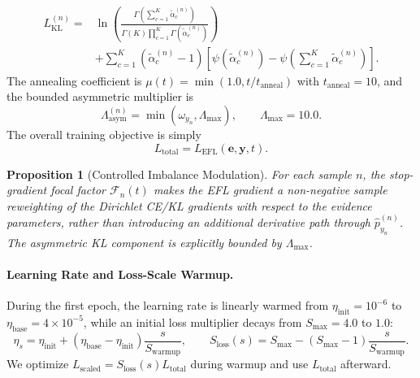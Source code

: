 \documentclass[letterpaper]{article} %
\newtheorem{proposition}{Proposition}
\begin{document}
\begin{equation}\label{eq:kl_loss_main}
\begin{aligned}
    L_{\text{KL}}^{(n)}
    ={}& \ln \left(
    \frac{\Gamma\left(\sum_{c=1}^K\tilde{\alpha}_c^{(n)}\right)}
    {\Gamma(K)\prod_{c=1}^K\Gamma(\tilde{\alpha}_c^{(n)})}
    \right)\\
    &+\sum_{c=1}^K(\tilde{\alpha}_c^{(n)}-1)
    \left[
    \psi(\tilde{\alpha}_c^{(n)})
    -\psi\!\left(\sum_{c=1}^K\tilde{\alpha}_c^{(n)}\right)
    \right].
\end{aligned}
\end{equation}
The annealing coefficient is $\mu(t)=\min(1.0,t/t_{\text{anneal}})$ with $t_{\text{anneal}}=10$, and the bounded asymmetric multiplier is
\begin{equation}\label{eq:asym_multiplier}
    \Lambda_{\text{asym}}^{(n)}
    = \min(\omega_{y_n},\Lambda_{\max}),
    \qquad \Lambda_{\max}=10.0 .
\end{equation}
The overall training objective is simply
\begin{equation}\label{eq:total_loss}
    L_{\text{total}}=L_{\text{EFL}}(\bm{e},\bm{y},t).
\end{equation}

\begin{proposition}[Controlled Imbalance Modulation]
\label{prop:controlled_modulation}
For each sample $n$, the stop-gradient focal factor $\mathcal{F}_n(t)$ makes the EFL gradient a non-negative sample reweighting of the Dirichlet CE/KL gradients with respect to the evidence parameters, rather than introducing an additional derivative path through $\hat{p}_{y_n}^{(n)}$. The asymmetric KL component is explicitly bounded by $\Lambda_{\max}$.
\end{proposition}

\paragraph{Learning Rate and Loss-Scale Warmup.}
During the first epoch, the learning rate is linearly warmed from $\eta_{\text{init}}=10^{-6}$ to $\eta_{\text{base}}=4\times10^{-5}$, while an initial loss multiplier decays from $S_{\max}=4.0$ to $1.0$:
\begin{equation}\label{eq:warmup_main}
    \eta_s=\eta_{\text{init}}+(\eta_{\text{base}}-\eta_{\text{init}})
    \frac{s}{S_{\text{warmup}}},
    \qquad
    S_{\text{loss}}(s)=S_{\max}-(S_{\max}-1)
    \frac{s}{S_{\text{warmup}}}.
\end{equation}
We optimize $L_{\text{scaled}}=S_{\text{loss}}(s)L_{\text{total}}$ during warmup and use $L_{\text{total}}$ afterward.
\end{document}
